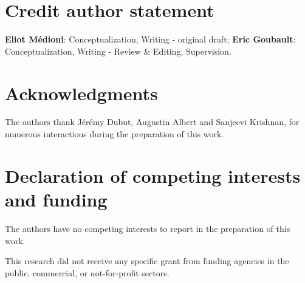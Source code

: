 \documentclass[a4paper,fleqn]{cas-sc}
\newtheorem{rem}{Remark}%
\newcommand{\cS}{{\mathcal{S}}}
\newcommand{\cT}{{\mathcal{T}}}
\begin{document}



%

\section*{Credit author statement}

{\bf Eliot M\'edioni}: Conceptualization, Writing - original draft;
{\bf Eric Goubault}: Conceptualization, Writing - Review \& Editing, Supervision.

\section*{Acknowledgments}
The authors thank J\'er\'emy Dubut, Augustin Albert and Sanjeevi Krishnan, for numerous interactions during the preparation of this work.

\section*{Declaration of competing interests and funding}

The authors have no competing interests to report in the preparation of this work. 

This research did not receive any specific grant from funding agencies in the public, commercial, or not-for-profit sectors.




%

\end{document}
